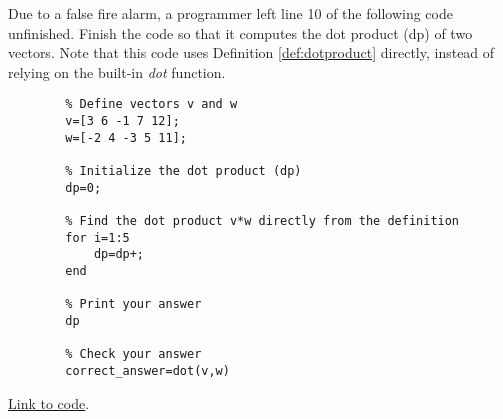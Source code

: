 \documentclass{ximera}
\begin{document}
\begin{problem}\label{prob_oct_vec_loop}
    Due to a false fire alarm, a programmer left line 10 of the following code unfinished.  Finish the code so that it computes the dot product (dp) of two vectors.  Note that this code uses Definition \ref{def:dotproduct} directly, instead of relying on the built-in \emph{dot} function.

    \begin{verbatim}
        % Define vectors v and w
        v=[3 6 -1 7 12];
        w=[-2 4 -3 5 11];

        % Initialize the dot product (dp)
        dp=0;

        % Find the dot product v*w directly from the definition
        for i=1:5
            dp=dp+;
        end

        % Print your answer
        dp

        % Check your answer
        correct_answer=dot(v,w)
    \end{verbatim}

    \href{https://sagecell.sagemath.org/?z=eJxdjssKwjAQRfeB_MPdFHwVjPUBSlaK4M59EZEmxWBNyhgT9OtNqRud3cy9nDkZdro2ViPoyjt6IOBiFSJnQZYFlsgFVhCz04azKMt8hjnyAgsI0Z04y3CwxptLY94a_qqhnEdLTj0rj4Fqh5ypVk6_3b1J8P9WGEUoQ0mgeaEmd-8bnVciO8tZ7QhGivWCM6RJQNWOE1Jb1XOPZKzHyz0p6T-ipu5rH22vurr9RpWj7tu532VyGYRJHH4ATLJPyQ==&lang=octave&interacts=eJyLjgUAARUAuQ==}{Link to code}.

\end{problem}
 
\end{document}
